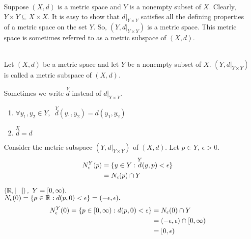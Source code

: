 \begin{remark}
    Suppose $(X,d)$ is a metric space and $Y$ is a nonempty subset of $X$. Clearly, $Y \times Y \subseteq X \times X.$ It is easy to show that $d |_{Y\times Y}$ satisfies all the defining properties of a metric space on the set $Y$. So, $\left(Y, d |_{Y\times Y}\right)$ is a metric space. This metric space is sometimes referred to as a metric subspace of $(X,d).$
\end{remark}

\begin{definition} \leavevmode \\
    Let $(X,d)$ be a metric space and let $Y$ be a nonempty subset of $X$. $\left(Y, d|_{Y\times Y}\right)$ is called a metric subspace of $(X,d)$.
    \begin{notation}
        Sometimes we write $\overset{Y}{d}$ instead of $d|_{Y\times Y}$.
        \begin{enumerate} [$*)$]
            \item $\forall y_1, y_2\in Y,$ $~\overset{Y}{d}(y_1, y_2) = d(y_1, y_2)$
            \item $\overset{X}{d} = d$
        \end{enumerate}
    \end{notation}
\end{definition}

\begin{remark}
    Consider the metric subspace $\left(Y, d|_{Y\times Y}\right)$ of $(X,d)$. Let $p\in Y, ~\epsilon > 0$.
    \begin{align*}
        N_{\epsilon}^{Y}(p) &= \{y \in Y : \overset{Y}{d}(y,p) < \epsilon\} \\
        &= N_{\epsilon}(p)\cap Y
    \end{align*}
\end{remark}

\begin{example}
    $\left(\mathbb{R}, |~~|\right), ~Y = [0, \infty).$ \leavevmode \\
    $N_{\epsilon}(0) = \{p \in \mathbb{R} : d(p,0) < \epsilon\} = (-\epsilon, \epsilon).$
    \begin{align*}
        N_{\epsilon}^{Y}(0) = \{p \in [0, \infty) : d(p, 0) < \epsilon\} &= N_{\epsilon}(0)\cap Y \\
        &= (-\epsilon, \epsilon) \cap [0, \infty) \\
        &= [0, \epsilon)
    \end{align*}
\end{example}

